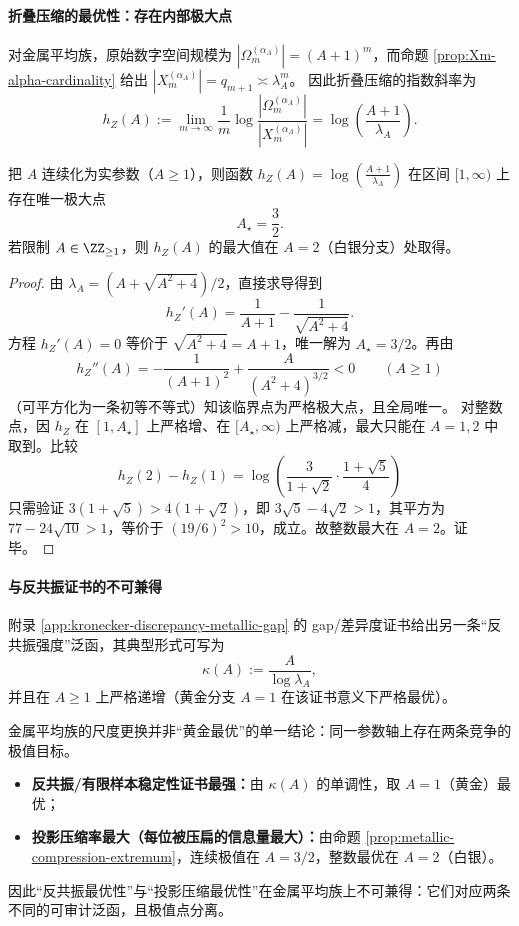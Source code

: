 \paragraph{折叠压缩的最优性：存在内部极大点}
对金属平均族，原始数字空间规模为 $|\Omega_m^{(\alpha_A)}|=(A+1)^m$，而命题 \ref{prop:Xm-alpha-cardinality} 给出
\(
|X_m^{(\alpha_A)}|=q_{m+1}\asymp \lambda_A^m
\)。
因此折叠压缩的指数斜率为
\[
h_Z(A):=\lim_{m\to\infty}\frac{1}{m}\log\frac{|\Omega_m^{(\alpha_A)}|}{|X_m^{(\alpha_A)}|}
=\log\!\left(\frac{A+1}{\lambda_A}\right).
\]

\begin{proposition}[金属平均族的投影压缩率在 \texorpdfstring{$A=\frac{3}{2}$}{A=3/2} 处取极大]\label{prop:metallic-compression-extremum}
把 $A$ 连续化为实参数（$A\ge 1$），则函数
\(
h_Z(A)=\log\!\left(\frac{A+1}{\lambda_A}\right)
\)
在区间 $[1,\infty)$ 上存在唯一极大点
\[
A_\star=\frac{3}{2}.
\]
若限制 $A\in\ZZ_{\ge 1}$，则 $h_Z(A)$ 的最大值在 $A=2$（白银分支）处取得。
\end{proposition}
\begin{proof}
由 $\lambda_A=(A+\sqrt{A^2+4})/2$，直接求导得到
\[
h_Z'(A)=\frac{1}{A+1}-\frac{1}{\sqrt{A^2+4}}.
\]
方程 $h_Z'(A)=0$ 等价于 $\sqrt{A^2+4}=A+1$，唯一解为 $A_\star=3/2$。再由
\[
h_Z''(A)=-\frac{1}{(A+1)^2}+\frac{A}{(A^2+4)^{3/2}}<0\qquad(A\ge 1)
\]
（可平方化为一条初等不等式）知该临界点为严格极大点，且全局唯一。
对整数点，因 $h_Z$ 在 $[1,A_\star]$ 上严格增、在 $[A_\star,\infty)$ 上严格减，最大只能在 $A=1,2$ 中取到。比较
\[
h_Z(2)-h_Z(1)=\log\!\left(\frac{3}{1+\sqrt2}\cdot\frac{1+\sqrt5}{4}\right)
\]
只需验证
\(
3(1+\sqrt5)>4(1+\sqrt2)
\)，即
\(
3\sqrt5-4\sqrt2>1
\)，其平方为 $77-24\sqrt{10}>1$，等价于 $(19/6)^2>10$，成立。故整数最大在 $A=2$。证毕。
\end{proof}

\paragraph{与反共振证书的不可兼得}
附录 \ref{app:kronecker-discrepancy-metallic-gap} 的 gap/差异度证书给出另一条“反共振强度”泛函，其典型形式可写为
\[
\kappa(A):=\frac{A}{\log\lambda_A},
\]
并且在 $A\ge 1$ 上严格递增（黄金分支 $A=1$ 在该证书意义下严格最优）。

\begin{remark}\label{rem:metallic-dual-optimality}
金属平均族的尺度更换并非“黄金最优”的单一结论：同一参数轴上存在两条竞争的极值目标。
\begin{itemize}
  \item \textbf{反共振/有限样本稳定性证书最强：}由 $\kappa(A)$ 的单调性，取 $A=1$（黄金）最优；
  \item \textbf{投影压缩率最大（每位被压扁的信息量最大）：}由命题 \ref{prop:metallic-compression-extremum}，连续极值在 $A=3/2$，整数最优在 $A=2$（白银）。
\end{itemize}
因此“反共振最优性”与“投影压缩最优性”在金属平均族上不可兼得：它们对应两条不同的可审计泛函，且极值点分离。
\end{remark}

